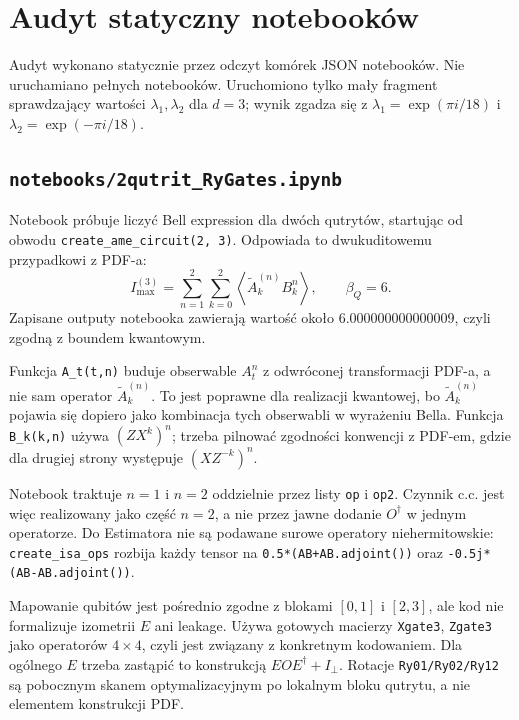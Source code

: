 \documentclass[12pt]{article}
\begin{document}
\section{Audyt statyczny notebook\'ow}

Audyt wykonano statycznie przez odczyt kom\'orek JSON notebook\'ow. Nie uruchamiano
pe\l{}nych notebook\'ow. Uruchomiono tylko ma\l{}y fragment sprawdzaj\k{a}cy warto\'sci
$\lambda_1,\lambda_2$ dla $d=3$; wynik zgadza si\k{e} z
$\lambda_1=\exp(\pi i/18)$ i $\lambda_2=\exp(-\pi i/18)$.

\subsection{\texttt{notebooks/2qutrit\_RyGates.ipynb}}

Notebook pr\'obuje liczy\'c Bell expression dla dw\'och qutryt\'ow, startuj\k{a}c od obwodu
\texttt{create\_ame\_circuit(2, 3)}. Odpowiada to dwukuditowemu przypadkowi z PDF-a:
\begin{equation}
    I_{\max}^{(3)}=\sum_{n=1}^{2}\sum_{k=0}^{2}
    \left\langle\widetilde{A}^{(n)}_kB_k^n\right\rangle,
    \qquad \beta_Q=6.
\end{equation}
Zapisane outputy notebooka zawieraj\k{a} warto\'s\'c oko\l{}o
$6.000000000000009$, czyli zgodn\k{a} z boundem kwantowym.

Funkcja \texttt{A\_t(t,n)} buduje obserwable $A_t^n$ z odwr\'oconej transformacji PDF-a,
a nie sam operator $\widetilde{A}^{(n)}_k$. To jest poprawne dla realizacji kwantowej,
bo $\widetilde{A}^{(n)}_k$ pojawia si\k{e} dopiero jako kombinacja tych obserwabli w
wyra\.zeniu Bella. Funkcja \texttt{B\_k(k,n)} u\.zywa $(ZX^k)^n$; trzeba pilnowa\'c zgodno\'sci
konwencji z PDF-em, gdzie dla drugiej strony wyst\k{e}puje $(XZ^{-k})^n$.

Notebook traktuje $n=1$ i $n=2$ oddzielnie przez listy \texttt{op} i \texttt{op2}. Czynnik
c.c. jest wi\k{e}c realizowany jako cz\k{e}\'s\'c $n=2$, a nie przez jawne dodanie
$O^\dagger$ w jednym operatorze. Do Estimatora nie s\k{a} podawane surowe operatory
niehermitowskie: \texttt{create\_isa\_ops} rozbija ka\.zdy tensor na
\texttt{0.5*(AB+AB.adjoint())} oraz \texttt{-0.5j*(AB-AB.adjoint())}.

Mapowanie qubit\'ow jest po\'srednio zgodne z blokami $[0,1]$ i $[2,3]$, ale kod nie
formalizuje izometrii $E$ ani leakage. U\.zywa gotowych macierzy \texttt{Xgate3},
\texttt{Zgate3} jako operator\'ow $4\times4$, czyli jest zwi\k{a}zany z konkretnym kodowaniem.
Dla og\'olnego $E$ trzeba zast\k{a}pi\'c to konstrukcj\k{a} $EOE^\dagger+I_\perp$.
Rotacje \texttt{Ry01/Ry02/Ry12} s\k{a} pobocznym skanem optymalizacyjnym po lokalnym
bloku qutrytu, a nie elementem konstrukcji PDF.
\end{document}
